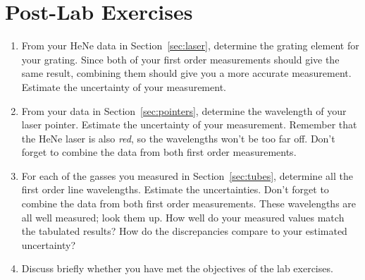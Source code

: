 \documentclass[12pt]{article}
\begin{document}
\newpage

\section*{Post-Lab Exercises}

\begin{enumerate}
\item From your HeNe data in Section~\ref{sec:laser}, determine the
  grating element for your grating.  Since both of your first order
  measurements should give the same result, combining them should give
  you a more accurate measurement.  Estimate the uncertainty of your
  measurement.
\item From your data in Section~\ref{sec:pointers}, determine the
  wavelength of your laser pointer.  Estimate the uncertainty of your
  measurement.  Remember that the HeNe laser is also \textit{red}, so
  the wavelengths won't be too far off.  Don't forget to combine the
  data from both first order measurements.
\item For each of the gasses you measured in Section~\ref{sec:tubes},
  determine all the first order line wavelengths.  Estimate the
  uncertainties.  Don't forget to combine the data from both first
  order measurements.  These wavelengths are all well measured; look
  them up.  How well do your measured values match the tabulated
  results?  How do the discrepancies compare to your estimated
  uncertainty? 
\item Discuss briefly whether you have met the objectives of the lab
  exercises.
\end{enumerate}
\end{document}
